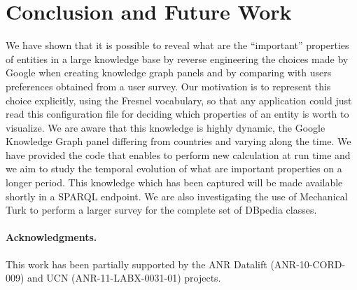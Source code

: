 \documentclass[runningheads,a4paper]{llncs}
\begin{document}

\section{Conclusion and Future Work}
\label{sec:conclusion}
We have shown that it is possible to reveal what are the ``important'' properties of entities in a large knowledge base by reverse engineering the choices made by Google when creating knowledge graph panels and by comparing with users preferences obtained from a user survey. Our motivation is to represent this choice explicitly, using the Fresnel vocabulary, so that any application could just read this configuration file for deciding which properties of an entity is worth to visualize. We are aware that this knowledge is highly dynamic, the Google Knowledge Graph panel differing from countries and varying along the time. We have provided the code that enables to perform new calculation at run time and we aim to study the temporal evolution of what are important properties on a longer period. This knowledge which has been captured will be made available shortly in a SPARQL endpoint. We are also investigating the use of Mechanical Turk to perform a larger survey for the complete set of DBpedia classes.


\paragraph{\textbf{Acknowledgments.}} %
This work has been partially supported by the ANR Datalift (ANR-10-CORD-009) and UCN (ANR-11-LABX-0031-01) projects.


\nocite{*}

\end{document}
